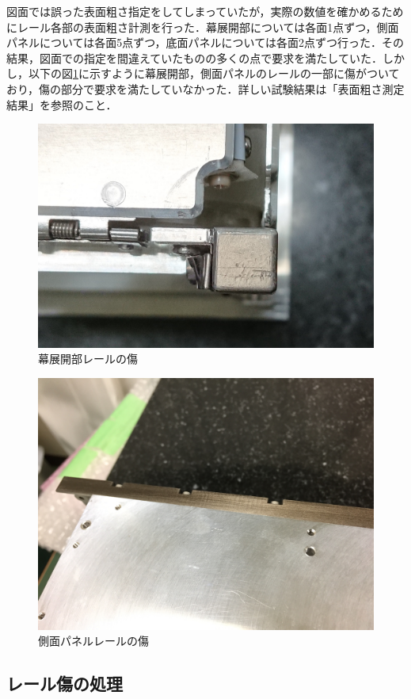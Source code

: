 図面では誤った表面粗さ指定をしてしまっていたが，実際の数値を確かめるためにレール各部の表面粗さ計測を行った．幕展開部については各面1点ずつ，側面パネルについては各面5点ずつ，底面パネルについては各面2点ずつ行った．その結果，図面での指定を間違えていたものの多くの点で要求を満たしていた．しかし，以下の図\ref{fig:scratch1}に示すように幕展開部，側面パネルのレールの一部に傷がついており，傷の部分で要求を満たしていなかった．詳しい試験結果は「表面粗さ測定結果」を参照のこと．

\begin{figure}[h]
	\begin{center}
		
		\includegraphics[width=0.6\linewidth]{04/fig/scratch1.jpg}
		\caption{幕展開部レールの傷}
		\label{fig:scratch1}
		
	\end{center}
\end{figure}

\begin{figure}[h]
	\begin{center}
		
		\includegraphics[width=0.6\linewidth]{04/fig/scratch2.jpg}
		\caption{側面パネルレールの傷}
		\label{fig:scratch2}
		
	\end{center}
\end{figure}

\subsection{レール傷の処理}

